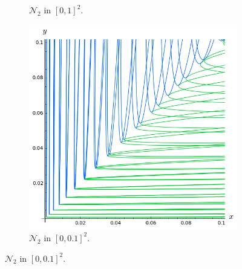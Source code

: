 \documentclass{beamer}
\begin{document}
\begin{frame}
\begin{figure}
\begin{subfigure}{.28\linewidth}
\vspace{-0.1cm}\caption{$\mathcal{N}_2$ in $[0, 1]^2$.}
\end{subfigure} \hspace{0.4cm}
\begin{subfigure}{.28\linewidth}\centering
\includegraphics[width=1\textwidth]{plots/ch5_33_4curves3.png}
\vspace{-0.1cm}\caption{$\mathcal{N}_2$ in $[0, 0.1]^2$.}
\end{subfigure}
\end{figure}
\end{frame}

\section{ }
\end{document}
